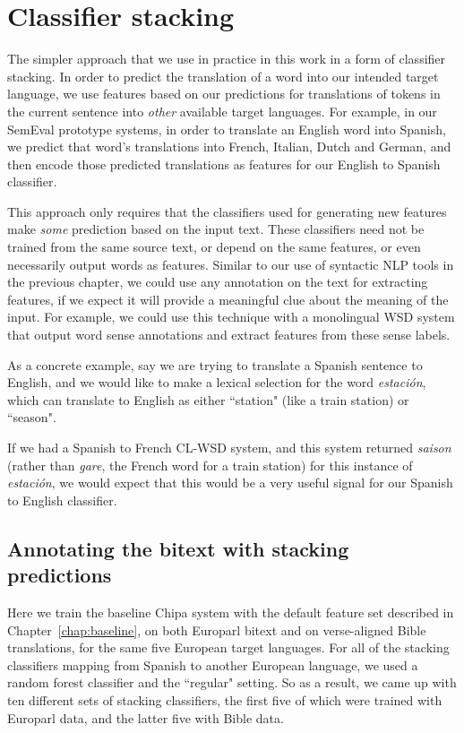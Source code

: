 \section{Classifier stacking}

The simpler approach that we use in practice in this work in a form of
classifier stacking. In order to predict the translation of a word into our
intended target language, we use features based on our predictions for
translations of tokens in the current sentence into \emph{other} available
target languages.
For example, in our SemEval prototype systems, in order to translate an
English word into Spanish, we predict that word's translations into French,
Italian, Dutch and German, and then encode those predicted translations as
features for our English to Spanish classifier.

This approach only requires that the classifiers used for generating new
features make \emph{some} prediction based on the input text. These classifiers 
need not be trained from the same source text, or depend on the same features,
or even necessarily output words as features. Similar to our use of syntactic
NLP tools in the previous chapter, we could use any annotation on the text for
extracting features, if we expect it will provide a meaningful clue about the
meaning of the input. For example, we could use this technique with a
monolingual WSD system that output word sense annotations and extract features
from these sense labels.

As a concrete example, say we are trying to translate a Spanish sentence to
English, and we would like to make a lexical selection for the word
\emph{estación}, which can translate to English as either ``station" (like a
train station) or ``season".

\label{sent:estacion}

If we had a Spanish to French CL-WSD system, and this system returned
\emph{saison} (rather than \emph{gare}, the French word for a train station)
for this instance of \emph{estación}, we would expect that this would be a very
useful signal for our Spanish to English classifier.

\subsection{Annotating the bitext with stacking predictions}

Here we train the baseline Chipa system with the default feature set described
in Chapter~\ref{chap:baseline}, on both Europarl bitext and on verse-aligned
Bible translations, for the same five European target languages. For all of
the stacking classifiers mapping from Spanish to another European language, we
used a random forest classifier and the ``regular" setting. So as a result, we
came up with ten different sets of stacking classifiers, the first five of
which were trained with Europarl data, and the latter five with Bible data.

